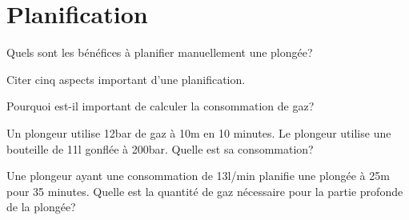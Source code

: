\documentclass[english,12pt,a4paper]{article}
\begin{document}
	\section{Planification}
	\begin{outline}
		\1 Quels sont les bénéfices à planifier manuellement une plongée?
			\2 \hspace{-2em}\hrulefill
			\2 \hspace{-2em}\hrulefill
			\2 \hspace{-2em}\hrulefill
			\2 \hspace{-2em}\hrulefill

		\1 Citer cinq aspects important d'une planification.
			\2 \hspace{-2em}\hrulefill
			\2 \hspace{-2em}\hrulefill
			\2 \hspace{-2em}\hrulefill
			\2 \hspace{-2em}\hrulefill
			\2 \hspace{-2em}\hrulefill

		\1 Pourquoi est-il important de calculer la consommation de gaz?
			\2 \hspace{-2em}\hrulefill
			\2 \hspace{-2em}\hrulefill
			\2 \hspace{-2em}\hrulefill

		\1 Un plongeur utilise 12bar de gaz à 10m en 10 minutes. Le plongeur utilise une bouteille de 11l gonflée à 200bar. Quelle est sa consommation?
			\2 \hspace{-2em}\hrulefill
			\2 \hspace{-2em}\hrulefill
			\2 \hspace{-2em}\hrulefill
			\2 \hspace{-2em}\hrulefill

		\1 Une plongeur ayant une consommation de 13l/min planifie une plongée à 25m pour 35 minutes. Quelle est la quantité de gaz nécessaire pour la partie profonde de la plongée?
			\2 \hspace{-2em}\hrulefill
			\2 \hspace{-2em}\hrulefill
			\2 \hspace{-2em}\hrulefill
			\2 \hspace{-2em}\hrulefill


\end{outline}
\end{document}
